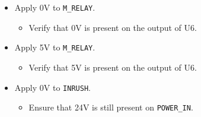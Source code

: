 \begin{itemize}
\begin{itemize}
\begin{itemize}
		\end{itemize}
	\end{itemize}
	\item Apply 0V to \texttt{M\_RELAY}.
	\begin{itemize}
		\item[\cmark] Verify that 0V is present on the output of U6.
	\end{itemize}
	\item Apply 5V to \texttt{M\_RELAY}.
	\begin{itemize}
		\item[\cmark] Verify that 5V is present on the output of U6.
	\end{itemize}
	\item Apply 0V to \texttt{INRUSH}.
	\begin{itemize}
		\item[\cmark] Ensure that 24V is still present on \texttt{POWER\_IN}.
	\end{itemize}
\end{itemize}
